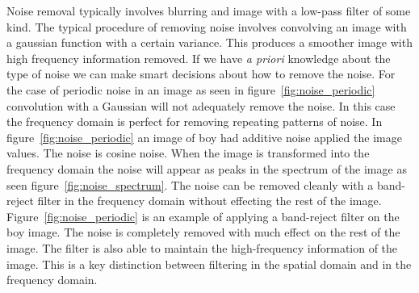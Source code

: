 \documentclass[letterpaper]{article}
\begin{document}
Noise removal typically involves blurring and image with a low-pass filter of some kind. The typical procedure of removing noise involves convolving an image with a gaussian function with a certain variance. This produces a smoother image with high frequency information removed. If we have \emph{a priori} knowledge about the type of noise we can make smart decisions about how to remove the noise. For the case of periodic noise in an image as seen in figure~\ref{fig:noise_periodic} convolution with a Gaussian will not adequately remove the noise. In this case the frequency domain is perfect for removing repeating patterns of noise. In figure~\ref{fig:noise_periodic} an image of boy had additive noise applied the image values. The noise is cosine noise. When the image is transformed into the frequency domain the noise will appear as peaks in the spectrum of the image as seen figure~\ref{fig:noise_spectrum}. The noise can be removed cleanly with a band-reject filter in the frequency domain without effecting the rest of the image. Figure~\ref{fig:noise_periodic} is an example of applying a band-reject filter on the boy image. The noise is completely removed with much effect on the rest of the image. The filter is also able to maintain the high-frequency information of the image. This is a key distinction between filtering in the spatial domain and in the frequency domain.
\end{document}
